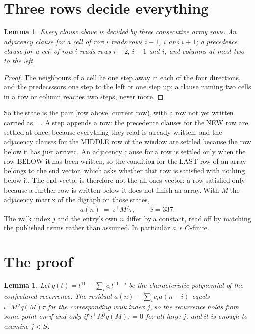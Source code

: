\documentclass[11pt,a4paper]{article}
\theoremstyle{plain}
\newtheorem{lemma}[theorem]{Lemma}
\theoremstyle{definition}
\begin{document}
\section{Three rows decide everything}

\begin{lemma}\label{lem:win}
Every clause above is decided by three consecutive array rows. An adjacency clause for a cell
of row $i$ reads rows $i-1$, $i$ and $i+1$; a precedence clause for a cell of row $i$ reads
rows $i-2$, $i-1$ and $i$, and columns at most two to the left.
\end{lemma}

\begin{proof}
The neighbours of a cell lie one step away in each of the four directions, and the predecessors
one step to the left or one step up; a clause naming two cells in a row or column reaches two
steps, never more.
\end{proof}

So the state is the pair (row above, current row), with a row not yet written carried as
$\bot$. A step appends a row: the precedence clauses for the NEW row are settled at once,
because everything they read is already written, and the adjacency clauses for the MIDDLE row
of the window are settled because the row below it has just arrived. An adjacency clause for a row is settled only when the row BELOW it has been
written, so the condition for the LAST row of an array belongs to the end vector, which asks
whether that row is satisfied with nothing below it. The end vector is therefore not the
all-ones vector: a row satisfied only because a further row is written below it does not
finish an array. With $M$ the
adjacency matrix of the digraph on those states,
\[
a(n)\;=\;\iota^{\!\top}M^{\,j}\tau ,\qquad S=337.
\]
The walk index $j$ and the entry's own $n$ differ by a constant, read off by matching the
published terms rather than assumed. In particular $a$ is $C$-finite.

\section{The proof}

\begin{lemma}\label{lem:crit}
Let $q(t)=t^{11}-\sum_i c_it^{11-i}$ be the characteristic polynomial of the
conjectured recurrence. The residual $a(n)-\sum_ic_ia(n-i)$ equals
$\iota^{\!\top}M^{\,j}q(M)\tau$ for the corresponding walk index $j$, so the recurrence
holds from some point on if and only if $\iota^{\!\top}M^{j}q(M)\tau=0$ for all large $j$,
and it is enough to examine $j<S$.
\end{lemma}
\end{document}
